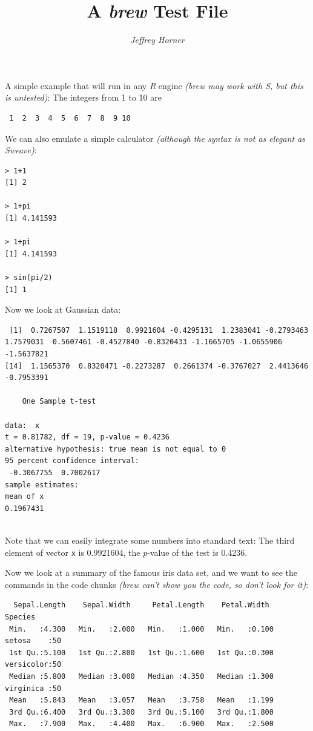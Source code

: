 \documentclass[a4paper]{article}
\title{A \emph{brew} Test File}
\author{\emph{Jeffrey Horner}}
\begin{document}
\maketitle

A simple example that will run in any \emph{R} engine \emph{(brew may work with S, but this is untested)}: The integers from 1 to
10 are
\begin{verbatim}
 1  2  3  4  5  6  7  8  9 10
\end{verbatim}

We can also emulate a simple calculator \emph{(although the syntax is not as elegant as Sweave)}:
\begin{verbatim}
> 1+1
[1] 2

> 1+pi
[1] 4.141593

> 1+pi
[1] 4.141593

> sin(pi/2)
[1] 1

\end{verbatim}

Now we look at Gaussian data:

\begin{verbatim}
 [1]  0.7267507  1.1519118  0.9921604 -0.4295131  1.2383041 -0.2793463  1.7579031  0.5607461 -0.4527840 -0.8320433 -1.1665705 -1.0655906 -1.5637821
[14]  1.1565370  0.8320471 -0.2273287  0.2661374 -0.3767027  2.4413646 -0.7953391

	One Sample t-test

data:  x
t = 0.81782, df = 19, p-value = 0.4236
alternative hypothesis: true mean is not equal to 0
95 percent confidence interval:
 -0.3067755  0.7002617
sample estimates:
mean of x 
0.1967431 


\end{verbatim}

Note that we can easily integrate some numbers into standard text: The
third element of vector \texttt{x} is 0.9921604, the
$p$-value of the test is 0.4236. %

Now we look at a summary of the famous iris data set, and we want to
see the commands in the code chunks \emph{(brew can't show you the code, so
don't look for it)}:

\begin{verbatim}
  Sepal.Length    Sepal.Width     Petal.Length    Petal.Width          Species  
 Min.   :4.300   Min.   :2.000   Min.   :1.000   Min.   :0.100   setosa    :50  
 1st Qu.:5.100   1st Qu.:2.800   1st Qu.:1.600   1st Qu.:0.300   versicolor:50  
 Median :5.800   Median :3.000   Median :4.350   Median :1.300   virginica :50  
 Mean   :5.843   Mean   :3.057   Mean   :3.758   Mean   :1.199                  
 3rd Qu.:6.400   3rd Qu.:3.300   3rd Qu.:5.100   3rd Qu.:1.800                  
 Max.   :7.900   Max.   :4.400   Max.   :6.900   Max.   :2.500                  

\end{verbatim}
\end{document}
